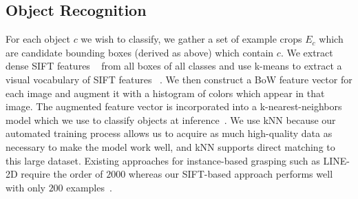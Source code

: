 \documentclass[conference]{IEEEtran}
\newcommand{\stnote}[1]{\textcolor{blue}{\textbf{ST: #1}}}
\begin{document}
\subsection{Object Recognition}
\label{sec:recognition}

For each object $c$ we wish to classify, we gather a set of example
crops $E_c$ which are candidate bounding boxes (derived as above)
which contain $c$. We extract dense SIFT features ~\citep{lowe99} from
all boxes of all classes and use k-means to extract a visual
vocabulary of SIFT features ~\citep{szeliski10}. We then construct a
BoW feature vector for each image and augment it with a histogram of
colors which appear in that image.  The augmented feature vector is
incorporated into a k-nearest-neighbors model which we use to classify
objects at inference~\citep{szeliski10}. We use kNN because our
automated training process allows us to acquire as much high-quality
data as necessary to make the model work well, and kNN supports direct
matching to this large dataset.  Existing approaches for
instance-based grasping such as LINE-2D require the order of $2000$
whereas our SIFT-based approach performs well with only $200$
examples~\citep{hinterstoisser12}.




\end{document}
